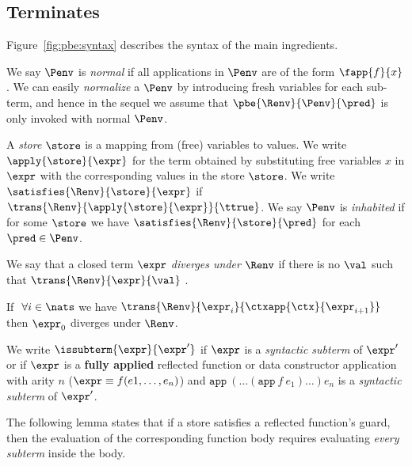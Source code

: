 \subsection{\pbesym Terminates} \label{sec:pbe:termination}
%
Figure~\ref{fig:pbe:syntax} describes the syntax of
the main ingredients.
%



%
We say $\Penv$ is \emph{normal}
if all applications in $\Penv$ are
of the form $\fapp{f}{x}$.
%
We can easily \emph{normalize}
a $\Penv$ by introducing fresh
variables for each sub-term, and
hence in the sequel we assume
that $\pbe{\Renv}{\Penv}{\pred}$
is only invoked with normal $\Penv$.

%
A \emph{store} $\store$ is a mapping from
(free) variables to values.
%
We write $\apply{\store}{\expr}$ for the term
obtained by substituting free variables $x$
in $\expr$ with the corresponding values in
the store $\store$.
%
We write $\satisfies{\Renv}{\store}{\expr}$
if $\trans{\Renv}{\apply{\store}{\expr}}{\ttrue}$.
%
We say $\Penv$ is \emph{inhabited}
if for some $\store$ we have
$\satisfies{\Renv}{\store}{\pred}$
for each $\pred \in \Penv$.


%
We say that a closed term $\expr$
\emph{diverges under} $\Renv$ if
there is no $\val$ such that
$\trans{\Renv}{\expr}{\val}$ .

\begin{lemma} \label{lem:div} %
If $\ \forall i \in \nats$ we have
$\trans{\Renv}{\expr_i}{\ctxapp{\ctx}{\expr_{i+1}}}$
then $\expr_0$ diverges under $\Renv$.
\end{lemma}


We write $\issubterm{\expr}{\expr'}$
if $\expr$ is a \emph{syntactic subterm}
of $\expr'$ or if 
$\expr$ is a \textbf{fully applied} 
reflected function or data constructor application with arity $n$
($\expr \equiv f (e1, \dots, e_n)$)
and $\texttt{app}\ (\dots (\texttt{app}\ f\ e_1) \dots ) e_n$
is a \emph{syntactic subterm}
of $\expr'$.

%
The following lemma states that
if a store satisfies a reflected
function's guard, then the evaluation
of the corresponding function body
requires evaluating \emph{every subterm}
inside the body.

